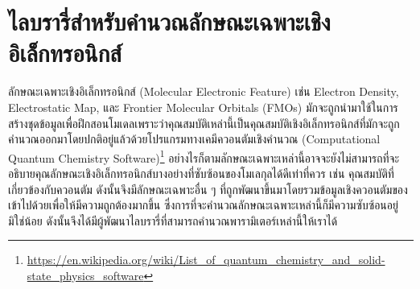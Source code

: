 \section{ไลบรารี่สำหรับคำนวณลักษณะเฉพาะเชิงอิเล็กทรอนิกส์}
\label{sec:lib_elec_feat}

ลักษณะเฉพาะเชิงอิเล็กทรอนิกส์ (Molecular Electronic Feature) เช่น Electron Density, Electrostatic Map, และ Frontier Molecular Orbitals (FMOs) มักจะถูกนำมาใช้ในการสร้างชุดข้อมูลเพื่อฝึกสอนโมเดลเพราะว่าคุณสมบัติเหล่านี้เป็นคุณสมบัติเชิงอิเล็กทรอนิกส์ที่มักจะถูกคำนวณออกมาโดยปกติอยู่แล้วด้วยโปรแกรมทางเคมีควอนตัมเชิงคำนวณ (Computational Quantum Chemistry Software)\footnote{\url{https://en.wikipedia.org/wiki/List_of_quantum_chemistry_and_solid-state_physics_software}} อย่างไรก็ตามลักษณะเฉพาะเหล่านี้อาจจะยังไม่สามารถที่จะอธิบายคุณลักษณะเชิงอิเล็กทรอนิกส์บางอย่างที่ซับซ้อนของโมเลกุลได้ดีเท่าที่ควร เช่น คุณสมบัติที่เกี่ยวข้องกับควอนตัม ดังนั้นจึงมีลักษณะเฉพาะอื่น ๆ ที่ถูกพัฒนาขึ้นมาโดยรวมข้อมูลเชิงควอนตัมของเข้าไปด้วยเพื่อให้มีความถูกต้องมากขึ้น ซึ่งการที่จะคำนวณลักษณะเฉพาะเหล่านี้ก็มีความซับซ้อนอยู่มิใช่น้อย ดังนั้นจึงได้มีผู้พัฒนาไลบรารี่ที่สามารถคำนวณพารามิเตอร์เหล่านี้ให้เราได้

